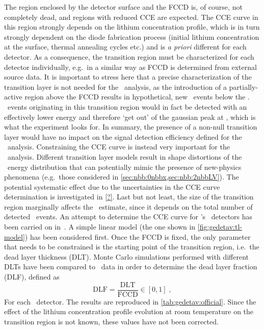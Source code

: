 The region enclosed by the detector surface and the FCCD is, of course, not completely
dead, and regions with reduced CCE are expected. The CCE curve in this region strongly
depends on the lithium concentration profile, which is in turn strongly dependent on the
diode fabrication process (initial lithium concentration at the surface, thermal annealing
cycles etc.) and is \emph{a priori} different for each detector. As a consequence, the
transition region must be characterized for each detector individually, e.g.~in a similar
way as FCCD is determined from external source data.
\newpar
It is important to stress here that a precise characterization of the transition layer is
not needed for the \onbb\ analysis, as the introduction of a partially-active region above
the FCCD results in hypothetical, new \onbb\ events below the \qbb. \onbb\ events
originating in this transition region would in fact be detected with an effectively lower
energy and therefore `get out' of the gaussian peak at \qbb, which is what the experiment
looks for. In summary, the presence of a non-null transition layer would have no impact on
the signal detection efficiency defined for the \onbb\ analysis. Constraining the CCE
curve is instead very important for the \nnbb\ analysis. Different transition layer models
result in shape distortions of the \nnbb\ energy distribution that can potentially mimic
the presence of new-physics phenomena (e.g.~those considered in
\cref{sec:nbb:0nbbx,sec:nbb:2nbbLV}). The potential systematic effect due to the
uncertainties in the CCE curve determination is investigated in \cref{?}. Last but not
least, the size of the transition region marginally affects the \thalftwo\ estimate, since
it depends on the total number of detected \nnbb\ events.
\newpar
An attempt to determine the CCE curve for \gerda's \bege\ detectors has been carried on
in~\cite{Lehnert2016}. A simple linear model (the one shown in
\cref{fig:gedetav:tl-model}) has been considered first. Once the FCCD is fixed, the only
parameter that needs to be constrained is the starting point of the transition region,
i.e.~the dead layer thickness (DLT). Monte Carlo simulations performed with different DLTs
have been compared to \Am\ data in order to determine the dead layer fraction (DLF),
defined as
\[
  \text{DLF} = \frac{\text{DLT}}{\text{FCCD}} \in [0,1] \;,
\]
For each \bege\ detector. The results are reproduced in \cref{tab:gedetav:official}. Since
the effect of the lithium concentration profile evolution at room temperature on the
transition region is not known, these values have not been corrected.


